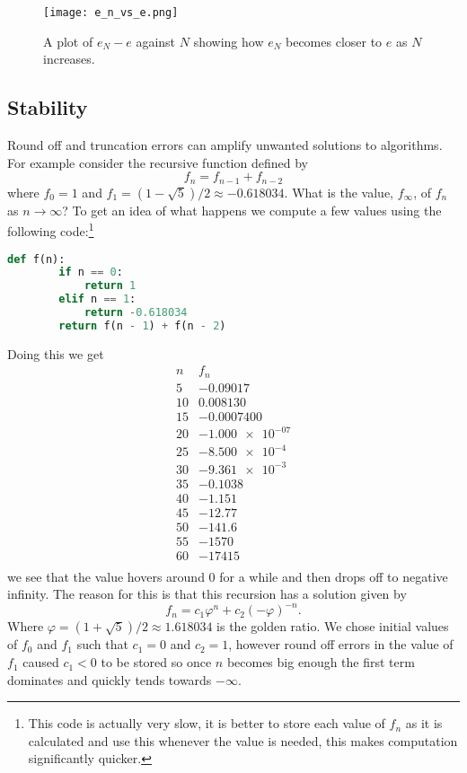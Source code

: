 \documentclass[a4paper]{article}
\begin{document}
    \begin{figure}[ht]
        \centering
        \texttt{[image: e\_n\_vs\_e.png]}
        \caption{A plot of \(e_N - e\) against \(N\) showing how \(e_N\) becomes closer to \(e\) as \(N\) increases.}
    \end{figure}
    
    \subsection{Stability}
    Round off and truncation errors can amplify unwanted solutions to algorithms.
    For example consider the recursive function defined by
    \[f_n = f_{n - 1} + f_{n - 2}\]
    where \(f_0 = 1\) and \(f_1 = (1 - \sqrt{5})/2 \approx -0.618034\).
    What is the value, \(f_{\infty}\), of \(f_n\) as \(n\to\infty\)?
    To get an idea of what happens we compute a few values using the following code:\footnote{This code is actually very slow, it is better to store each value of \(f_n\) as it is calculated and use this whenever the value is needed, this makes computation significantly quicker.}
    \begin{lstlisting}[language=python]
    def f(n):
        if n == 0:
            return 1
        elif n == 1:
            return -0.618034
        return f(n - 1) + f(n - 2)
    \end{lstlisting}
    Doing this we get
    \[
        \begin{array}{c|c}
            n & f_n\\\hline
            5 & -0.09017\\
            10 & 0.008130\\
            15 & -0.0007400\\
            20 & \num{-1.000e-07}\\
            25 & \num{-8.500e-4}\\
            30 & \num{-9.361e-3}\\
            35 & -0.1038\\
            40 & -1.151\\
            45 & -12.77\\
            50 & -141.6\\
            55 & -1570\\
            60 & -17415\\
        \end{array}
    \]
    we see that the value hovers around 0 for a while and then drops off to negative infinity.
    The reason for this is that this recursion has a solution given by
    \[f_n = c_1\varphi^n + c_2(-\varphi)^{-n}.\]
    Where \(\varphi = (1 + \sqrt{5})/2 \approx 1.618034\) is the golden ratio.
    We chose initial values of \(f_0\) and \(f_1\) such that \(c_1 = 0\) and \(c_2 = 1\), however round off errors in the value of \(f_1\) caused \(c_1 < 0\) to be stored so once \(n\) becomes big enough the first term dominates and quickly tends towards \(-\infty\).
    
\end{document}
